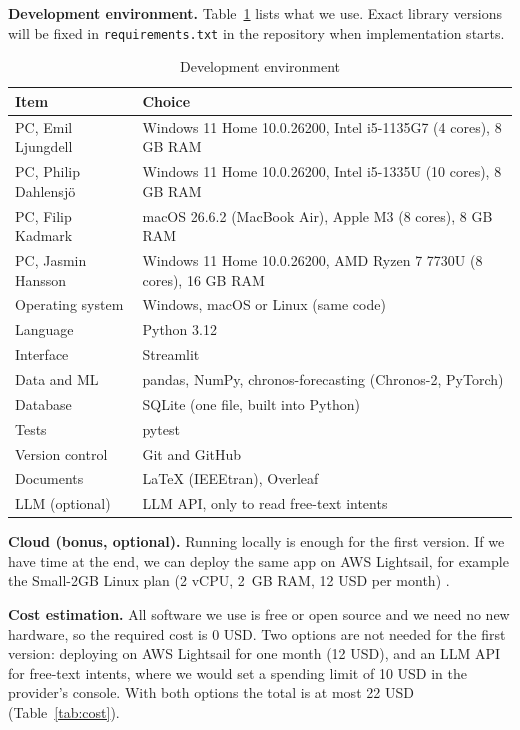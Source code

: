 \documentclass[conference,a4paper]{IEEEtran}
\begin{document}
\textbf{Development environment.} Table~\ref{tab:env} lists what we use. Exact library versions will be fixed in \texttt{requirements.txt} in the repository when implementation starts.

\begin{table}[t]
\caption{Development environment}
\label{tab:env}
\centering
\footnotesize
\setlength{\tabcolsep}{3pt}
\begin{tabular}{@{}p{}p{}@{}}
\toprule
\textbf{Item} & \textbf{Choice}\\
\midrule
PC, Emil Ljungdell & Windows 11 Home 10.0.26200, Intel i5-1135G7 (4 cores), 8 GB RAM\\
PC, Philip Dahlensj\"o & Windows 11 Home 10.0.26200, Intel i5-1335U (10 cores), 8 GB RAM\\
PC, Filip Kadmark & macOS 26.6.2 (MacBook Air), Apple M3 (8 cores), 8 GB RAM\\
PC, Jasmin Hansson & Windows 11 Home 10.0.26200, AMD Ryzen 7 7730U (8 cores), 16 GB RAM\\
Operating system & Windows, macOS or Linux (same code)\\
Language & Python 3.12\\
Interface & Streamlit\\
Data and ML & pandas, NumPy, chronos-forecasting (Chronos-2, PyTorch)\\
Database & SQLite (one file, built into Python)\\
Tests & pytest\\
Version control & Git and GitHub\\
Documents & LaTeX (IEEEtran), Overleaf\\
LLM (optional) & LLM API, only to read free-text intents\\
\bottomrule
\end{tabular}
\end{table}

\textbf{Cloud (bonus, optional).} Running locally is enough for the first version. If we have time at the end, we can deploy the same app on AWS Lightsail, for example the Small-2GB Linux plan (2 vCPU, 2~GB RAM, 12 USD per month) \cite{lightsail}.

\textbf{Cost estimation.} All software we use is free or open source and we need no new hardware, so the required cost is 0 USD. Two options are not needed for the first version: deploying on AWS Lightsail for one month (12 USD), and an LLM API for free-text intents, where we would set a spending limit of 10 USD in the provider's console. With both options the total is at most 22 USD (Table~\ref{tab:cost}).
\end{document}
